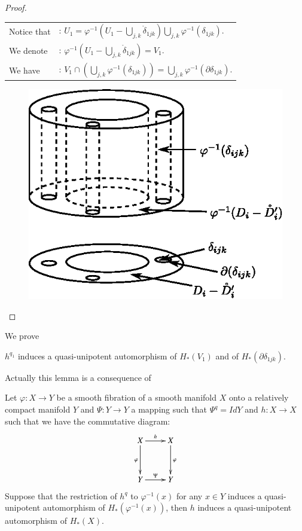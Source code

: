 \begin{proof}
\begin{tabular}{l@{\;}l}
Notice that & : \quad $U_1 = \varphi^{-1} (U_1 - \bigcup\limits_{j,k} \mathring{\delta}_{1jk}) \bigcup\limits_{j,k} \varphi^{-1} (\delta_{1jk})$. \\
We denote & : \quad $\varphi^{-1} (U_1 - \bigcup\limits_{j,k} \mathring{\delta}_{1jk}) = V_1$.\\
We have & : \quad $V_1 \cap (\bigcup\limits_{j,k} \varphi^{-1} (\delta_{1jk})) = \bigcup\limits_{j,k} \varphi^{-1} (\partial \delta_{1jk})$.
\end{tabular}
\begin{figure}[H]
\centering
\includegraphics{fig15-3.eps}
\end{figure}
\end{proof}
We prove\pageoriginale

\begin{lemma}\label{art15-lem3.5}
$h^{q_1}$ induces a quasi-unipotent automorphism of $H_* (V_1)$ and of $H_* (\partial \delta_{1jk})$.

Actually this lemma is a consequence of 
\end{lemma}

\begin{lemma}\label{art15-lem3.6}
Let $\varphi: X \to Y$ be a smooth fibration of a smooth manifold $X$ onto a relatively compact manifold $Y$ and $\Psi: Y \to Y$ a mapping such that $\Psi^q = IdY$ and $h: X \to X$ such that we have the commutative diagram:
\[
\xymatrix@R=1.2cm{
X \ar[r]^{h} \ar[d]_\varphi & X \ar[d]^\varphi\\
Y \ar[r]^\Psi & Y 
}
\]
Suppose that the restriction of $h^q$ to $\varphi^{-1} (x)$ for any $x \in Y$ induces a quasi-unipotent automorphism of $H_* (\varphi^{-1} (x))$, then $h$ induces a quasi-unipotent automorphism of $H_* (X)$.
\end{lemma}

